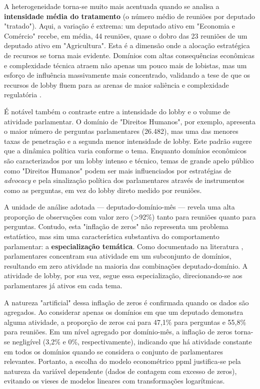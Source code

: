 A heterogeneidade torna-se muito mais acentuada quando se analisa a \textbf{intensidade média do tratamento} (o número médio de reuniões por deputado "tratado"). Aqui, a variação é extrema: um deputado ativo em "Economia e Comércio" recebe, em média, 44 reuniões, quase o dobro das 23 reuniões de um deputado ativo em "Agricultura". Esta é a dimensão onde a alocação estratégica de recursos se torna mais evidente. Domínios com altas consequências econômicas e complexidade técnica atraem não apenas um pouco mais de lobistas, mas um esforço de influência massivamente mais concentrado, validando a tese de que os recursos de lobby fluem para as arenas de maior saliência e complexidade regulatória \cite{kluver_informational_2012}.

É notável também o contraste entre a intensidade do lobby e o volume de atividade parlamentar. O domínio de "Direitos Humanos", por exemplo, apresenta o maior número de perguntas parlamentares (26.482), mas uma das menores taxas de penetração e a segunda menor intensidade de lobby. Este padrão sugere que a dinâmica política varia conforme o tema. Enquanto domínios econômicos são caracterizados por um lobby intenso e técnico, temas de grande apelo público como "Direitos Humanos" podem ser mais influenciados por estratégias de \textit{advocacy} e pela sinalização política dos parlamentares através de instrumentos como as perguntas, em vez do lobby direto medido por reuniões.

A unidade de análise adotada — deputado-domínio-mês — revela uma alta proporção de observações com valor zero (>92\%) tanto para reuniões quanto para perguntas. Contudo, esta "inflação de zeros" não representa um problema estatístico, mas sim uma característica substantiva do comportamento parlamentar: a \textbf{especialização temática}. Como documentado na literatura \cite{schiller1995senators, burden2015personal}, parlamentares concentram sua atividade em um subconjunto de domínios, resultando em zero atividade na maioria das combinações deputado-domínio. A atividade de lobby, por sua vez, segue essa especialização, direcionando-se aos parlamentares já ativos em cada tema.

A natureza "artificial" dessa inflação de zeros é confirmada quando os dados são agregados. Ao considerar apenas os domínios em que um deputado demonstra alguma atividade, a proporção de zeros cai para 47,1\% para perguntas e 55,8\% para reuniões. Em um nível agregado por domínio-mês, a inflação de zeros torna-se negligível (3,2\% e 0\%, respectivamente), indicando que há atividade constante em todos os domínios quando se considera o conjunto de parlamentares relevantes. Portanto, a escolha do modelo econométrico \acrshort{ppml} justifica-se pela natureza da variável dependente (dados de contagem com excesso de zeros), evitando os vieses de modelos lineares com transformações logarítmicas.

